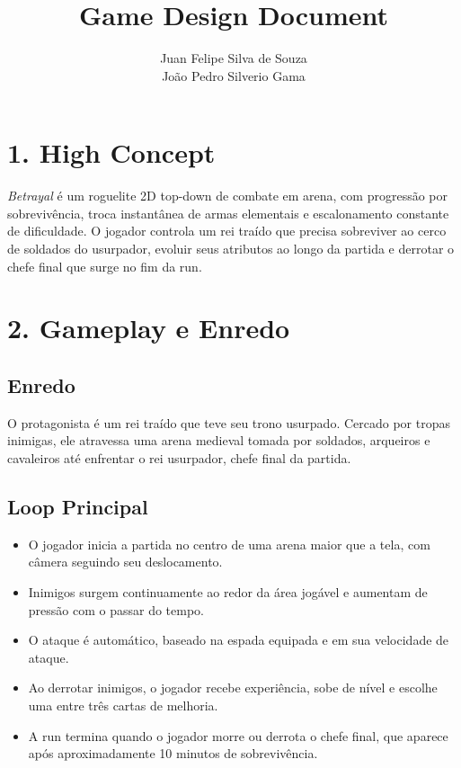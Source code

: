 \documentclass[a4paper,12pt]{article}
\title{\textbf{Game Design Document}}
\author{Juan Felipe Silva de Souza \\ João Pedro Silverio Gama}
\date{}
\begin{document}
\maketitle


\section*{1. High Concept}

\noindent
\textit{Betrayal} é um roguelite 2D top-down de combate em arena, com progressão por sobrevivência, troca instantânea de armas elementais e escalonamento constante de dificuldade. O jogador controla um rei traído que precisa sobreviver ao cerco de soldados do usurpador, evoluir seus atributos ao longo da partida e derrotar o chefe final que surge no fim da run.


\section*{2. Gameplay e Enredo}

\subsection*{Enredo}

O protagonista é um rei traído que teve seu trono usurpado. Cercado por tropas inimigas, ele atravessa uma arena medieval tomada por soldados, arqueiros e cavaleiros até enfrentar o rei usurpador, chefe final da partida.

\subsection*{Loop Principal}

\begin{itemize}
    \item O jogador inicia a partida no centro de uma arena maior que a tela, com câmera seguindo seu deslocamento.
    \item Inimigos surgem continuamente ao redor da área jogável e aumentam de pressão com o passar do tempo.
    \item O ataque é automático, baseado na espada equipada e em sua velocidade de ataque.
    \item Ao derrotar inimigos, o jogador recebe experiência, sobe de nível e escolhe uma entre três cartas de melhoria.
    \item A run termina quando o jogador morre ou derrota o chefe final, que aparece após aproximadamente 10 minutos de sobrevivência.
\end{itemize}
\end{document}
